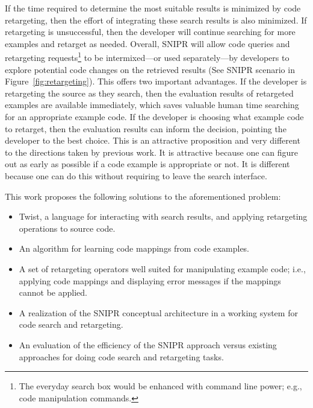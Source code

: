 If the time required to determine the most suitable results is minimized by code retargeting, then the effort of integrating these search results is also minimized. If retargeting is unsuccessful, then the developer will continue searching for more examples and retarget as needed. Overall, \uppercase{SnipR} will allow code queries and retargeting requests\footnote{The everyday search box would be enhanced with command line power; e.g., code manipulation commands.} to be intermixed---or used separately---by developers to explore potential code changes on the retrieved results (See \uppercase{SnipR} scenario in Figure~\ref{fig:retargeting}). This offers two important advantages. If the developer is retargeting the source as they search, then the evaluation results of retargeted examples are available immediately, which saves valuable human time searching for an appropriate example code. If the developer is choosing what example code to retarget, then the evaluation results can inform the decision, pointing the developer to the best choice. This is an attractive proposition and very different to the directions taken by previous work. It is attractive because one can figure out as early as possible if a code example is appropriate or not. It is different because one can do this without requiring to leave the search interface.

This work proposes the following solutions to the aforementioned problem:

\begin{itemize}
\item Twist, a language for interacting with search results, and applying retargeting operations to source code.
\item An algorithm for learning code mappings from code examples. 
\item A set of retargeting operators well suited for manipulating example code; i.e., applying code mappings and displaying error messages if the mappings cannot be applied.
\item A realization of the \uppercase{SnipR} conceptual architecture in a working system for code search and retargeting. 
\item An evaluation of the efficiency of the \uppercase{SnipR} approach versus existing approaches for doing code search and retargeting tasks. 
\end{itemize}

